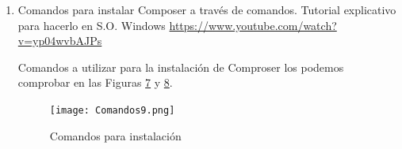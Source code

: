 \documentclass{article}
\begin{document}
\begin{enumerate}
\begin{enumerate}
\begin{figure}[!]
\centering
\texttt{[image: ImagenComposer2.jpg]}
\caption{\label{fig:02} Instalación Composer. Paso 2}
\end{figure}

\begin{figure}[!]
\centering
\texttt{[image: ImagenComposer3.jpg]}
\caption{\label{fig:03} Instalación Composer. Paso 3}
\end{figure}

\begin{figure}[!]
\centering
\texttt{[image: ImagenComposer4.jpg]}
\caption{\label{fig:04} Instalación Composer. Paso 4}
\end{figure}

\begin{figure}[!]
\centering
\texttt{[image: ImagenComposer5.jpg]}
\caption{\label{fig:05} Instalación Composer. Paso 5}
\end{figure}

\begin{figure}[!]
\centering
\texttt{[image: ImagenComposer6.jpg]}
\caption{\label{fig:06} Instalación Composer. Paso 6}
\end{figure}


En las Figuras \ref{fig:07} y \ref{fig:08} comprobamos que la instalación se ha realizado de forma correcta: ¿Cómo lo hacemos? Abrimos el terminal de windos con ‘cmd’ y una vez en él escribimos ‘Composer’ ejecutamos y este es el resultado que obtenemos para comprobar que se ha instalado de forma correcta.

\begin{figure}[!]
\centering
\texttt{[image: ImagenComposer7.jpg]}
\caption{\label{fig:07} Comprobación Composer. Paso 7}
\end{figure}

\begin{figure}[!]
\centering
\texttt{[image: ImagenComposer8.jpg]}
\caption{\label{fig:08} Comprobación Composer. Paso 8}
\end{figure}


            \item  Comandos para instalar Composer a través de comandos.
Tutorial explicativo para hacerlo en S.O. Windows \url{https://www.youtube.com/watch?v=yp04wvbAJPs}

Comandos a utilizar para la instalación de Comproser los podemos comprobar en las Figuras \ref{fig:08} y \ref{fig:09}.

\begin{figure}[!]
\centering
\texttt{[image: Comandos9.png]}
\caption{\label{fig:09} Comandos para instalación  }
\end{figure}


\end{enumerate}
\end{enumerate}
\end{document}
